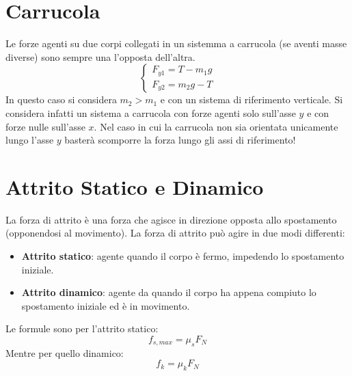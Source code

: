     \section{Carrucola} Le forze agenti su due corpi collegati in un sistemma a
    carrucola (se aventi masse diverse) sono sempre una l'opposta dell'altra.
        \begin{equation}
            \begin{cases}
                F_{y1} = T - m_1g \\
                F_{y2} = m_2g - T
            \end{cases}
        \end{equation}
    In questo caso si considera $m_2 > m_1$ e con un sistema di riferimento 
    verticale. Si considera infatti un sistema a carrucola con forze agenti 
    solo sull'asse $y$ e con forze nulle sull'asse $x$. Nel caso in cui la 
    carrucola non sia orientata unicamente lungo l'asse $y$ basterà scomporre
    la forza lungo gli assi di riferimento!

    \section{Attrito Statico e Dinamico} La forza di attrito è una forza che 
    agisce in direzione opposta allo spostamento (opponendosi al movimento). La 
    forza di attrito può agire in due modi differenti:
        \begin{itemize}
            \item \textbf{Attrito statico}: agente quando il corpo è fermo, 
            impedendo lo spostamento iniziale.
            \item \textbf{Attrito dinamico}: agente da quando il corpo ha 
            appena compiuto lo spostamento iniziale ed è in movimento.
        \end{itemize}
    Le formule sono per l'attrito statico:
        \begin{equation}
            f_{s, max} = \mu_sF_N
        \end{equation}
        Mentre per quello dinamico:
        \begin{equation}
            f_{k} = \mu_kF_N
        \end{equation}
    
